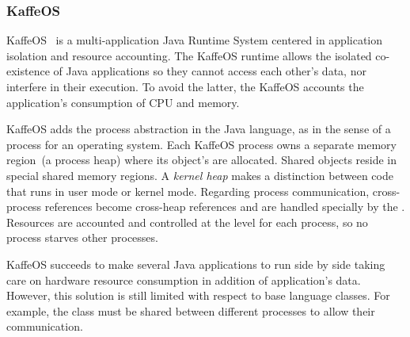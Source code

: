 
\subsubsection*{KaffeOS}

KaffeOS~\cite{Back00a} is a multi-application Java Runtime System centered in application isolation and resource accounting. The KaffeOS runtime allows the isolated co-existence of Java applications so they cannot access each other's data, nor interfere in their execution. To avoid the latter, the KaffeOS \VM accounts the application's consumption of CPU and memory.

KaffeOS adds the process abstraction in the Java language, as in the sense of a process for an operating system. Each KaffeOS process owns a separate memory region~(a process heap) where its object's are allocated. Shared objects reside in special shared memory regions. A \emph{kernel heap} makes a distinction between code that runs in user mode or kernel mode. Regarding process communication, cross-process references become cross-heap references and are handled specially by the \VM. Resources are accounted and controlled at the \VM level for each process, so no process starves other processes.

KaffeOS succeeds to make several Java applications to run side by side taking care on hardware resource consumption in addition of application's data. However, this solution is still limited with respect to base language classes. For example, the class  must be shared between different processes to allow their communication.

%

